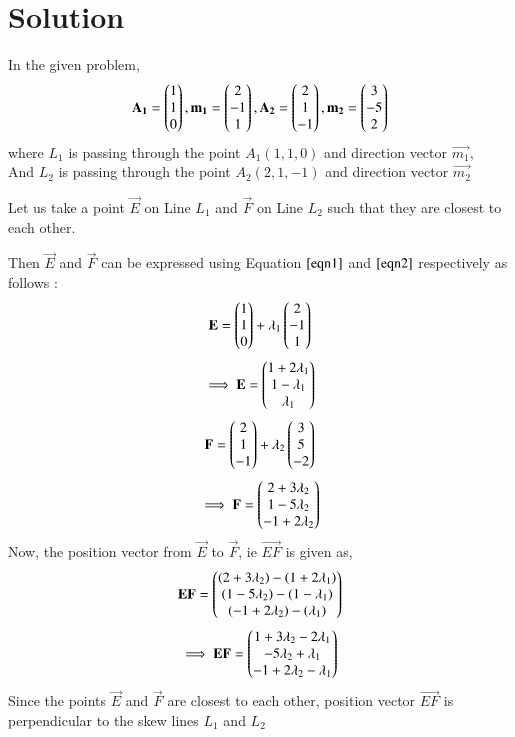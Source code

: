 \documentclass[journal,12pt,twocolumn]{IEEEtran}
\begin{document}
\section{Solution}
In the given problem,
\begin{align}\label{e3}
    \mathbf{A_1} = \begin{pmatrix}1 \\ 1 \\ 0\end{pmatrix}, \mathbf{m_1} = \begin{pmatrix}2 \\ -1 \\ 1\end{pmatrix}, \mathbf{A_2} = \begin{pmatrix}2 \\ 1 \\ -1\end{pmatrix}, \mathbf{m_2} = \begin{pmatrix}3 \\ -5 \\ 2\end{pmatrix}
\end{align}
where $L_1$ is passing through the point $A_1(1,1,0)$ and direction vector $\vec{m_1}$,\\
And $L_2$ is passing through the point $A_2(2,1,-1)$ and direction vector $\vec{m_2}$

Let us take a point $\vec{E}$ on Line $L_1$ and $\vec{F}$ on Line $L_2$ such that they are closest to each other.

Then $\vec{E}$ and $\vec{F}$ can be expressed using Equation $\ref{eqn1}$ and $\ref{eqn2}$ respectively as follows :
\begin{align}
    \mathbf{E} = \begin{pmatrix}1 \\ 1 \\ 0\end{pmatrix} + \lambda_1\begin{pmatrix}2 \\ -1 \\ 1\end{pmatrix}
\end{align}
\begin{align}
    \implies \mathbf{E} = \begin{pmatrix}1+2\lambda_1 \\ 1-\lambda_1 \\ \lambda_1\end{pmatrix}
\end{align}
\begin{align}
    \mathbf{F} = \begin{pmatrix}2 \\ 1 \\ -1\end{pmatrix} + \lambda_2\begin{pmatrix}3 \\ 5 \\ -2\end{pmatrix}
\end{align}
\begin{align}
    \implies \mathbf{F} = \begin{pmatrix}2+3\lambda_2 \\ 1-5\lambda_2 \\ -1+2\lambda_2\end{pmatrix}
\end{align}
Now, the position vector from $\vec{E}$ to $\vec{F}$, ie $\vec{EF}$ is given as,
\begin{align}
    \mathbf{EF} = \begin{pmatrix}(2+3\lambda_2)-(1+2\lambda_1) \\ (1-5\lambda_2)-(1-\lambda_1) \\ (-1+2\lambda_2)-(\lambda_1)\end{pmatrix}
\end{align}
\begin{align}\label{e4}
    \implies\mathbf{EF} = \begin{pmatrix} 1 + 3\lambda_2 -2\lambda_1 \\ -5\lambda_2 + \lambda_1 \\ -1 + 2\lambda_2 - \lambda_1\end{pmatrix}
\end{align}
Since the points $\vec{E}$ and $\vec{F}$ are closest to each other, position vector $\vec{EF}$ is perpendicular to the skew lines $L_1$ and $L_2$
\end{document}
